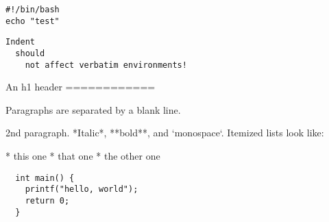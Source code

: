 \documentclass{minimal}
\begin{document}
\begin{verbatim}
#!/bin/bash
echo "test"
    \end{verbatim}

  \begin{lstlisting}
Indent
  should
    not affect verbatim environments!
    \end{lstlisting}

  \begin{markdown}
An h1 header
============

Paragraphs are separated by a blank line.

2nd paragraph.
*Italic*, **bold**, and `monospace`.
Itemized lists look like:

* this one
* that one
* the other one
 \end{markdown}

  \begin{verbatim}
  int main() {
    printf("hello, world");
    return 0;
  }
  \end{verbatim}
\end{document}
